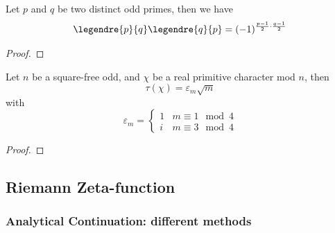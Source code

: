 \begin{colortheorem}
    Let \(p\) and \(q\) be two distinct odd primes, then we have
    \[\legendre{p}{q} \legendre{q}{p} = (-1)^{\frac{p-1}{2}\cdot \frac{q-1}{2}}\]
\end{colortheorem}
\begin{proof}
    
\end{proof}

\begin{colortheorem}
    Let \(n\) be a square-free odd, and \(\chi\) be a real primitive character mod \(n\), then 
    \[\tau(\chi) = \varepsilon_m \sqrt{m}\]
    with
    \[\varepsilon_m = \begin{cases}
        1 & m \equiv 1 \mod 4 \\
        i & m \equiv 3 \mod 4
    \end{cases}\]
\end{colortheorem}
\begin{proof}
    
\end{proof}

\subsection{Riemann Zeta-function}

\subsubsection{Analytical Continuation: different methods}

